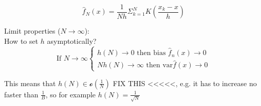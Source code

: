 {
    \begin{equation}
        \hat{f}_N(x) = \frac{1}{Nh}\Sigma_{k=1}^{N}K(\frac{x_k-x}{h})
    \end{equation}

    Limit properties ($N \rightarrow \infty$):\\
    How to set $h$ asymptotically?
    \begin{equation}
        \text{If } N \rightarrow \infty
        \begin{cases}
            h(N) \rightarrow 0 \text{ then bias } \hat{f}_n(x) \rightarrow 0\\
            Nh(N) \rightarrow \infty \text{ then } \text{var}\hat{f}(x) \rightarrow 0
        \end{cases}
    \end{equation}

    This means that $h(N) \in \mathcal{o}(\frac{1}{N})$ FIX THIS <<<<<, e.g. it has to increase no faster than $\frac{1}{B}$, so for example $h(N) = \frac{1}{\sqrt{N}}$

}




